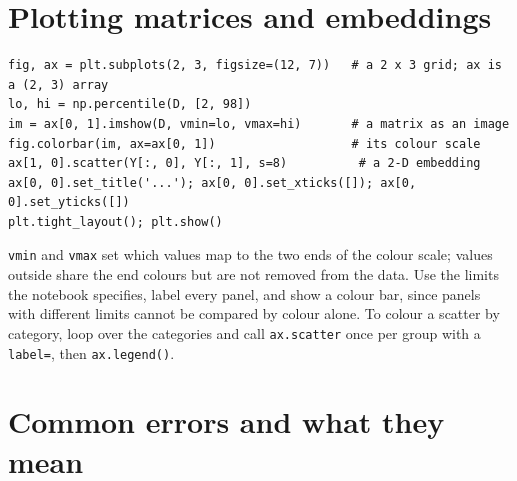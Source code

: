 \documentclass[11pt]{article}
\begin{document}
\section{Plotting matrices and embeddings}

\begin{codebox}
\begin{verbatim}
fig, ax = plt.subplots(2, 3, figsize=(12, 7))   # a 2 x 3 grid; ax is a (2, 3) array
lo, hi = np.percentile(D, [2, 98])
im = ax[0, 1].imshow(D, vmin=lo, vmax=hi)       # a matrix as an image
fig.colorbar(im, ax=ax[0, 1])                   # its colour scale
ax[1, 0].scatter(Y[:, 0], Y[:, 1], s=8)          # a 2-D embedding
ax[0, 0].set_title('...'); ax[0, 0].set_xticks([]); ax[0, 0].set_yticks([])
plt.tight_layout(); plt.show()
\end{verbatim}
\end{codebox}

\texttt{vmin} and \texttt{vmax} set which values map to the two ends of the colour scale;
values outside share the end colours but are not removed from the data. Use the limits the
notebook specifies, label every panel, and show a colour bar, since panels with different
limits cannot be compared by colour alone. To colour a scatter by category, loop over the
categories and call \texttt{ax.scatter} once per group with a \texttt{label=}, then
\texttt{ax.legend()}.

\section{Common errors and what they mean}\label{sec:errors}
\end{document}
